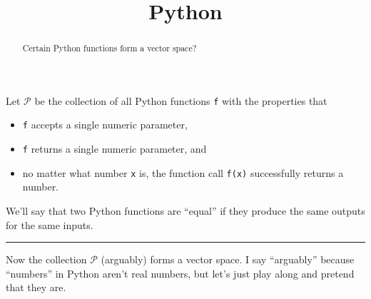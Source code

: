 \documentclass{ximera}
\title{Python}
\begin{document}
\begin{abstract}
  Certain Python functions form a vector space?
\end{abstract}

Let $\mathcal{P}$ be the collection of all Python functions \texttt{f} with the properties that
\begin{itemize}
\item \texttt{f} accepts a single numeric parameter,
\item \texttt{f} returns a single numeric parameter, and
\item no matter what number \texttt{x} is, the function call \texttt{f(x)} successfully returns a number.
\end{itemize}
We'll say that two Python functions are ``equal'' if they produce the same outputs for the same inputs.

\hrule

Now the collection $\mathcal{P}$ (arguably) forms a vector space.  I
say ``arguably'' because ``numbers'' in Python aren't real numbers,
but let's just play along and pretend that they are.
\end{document}
